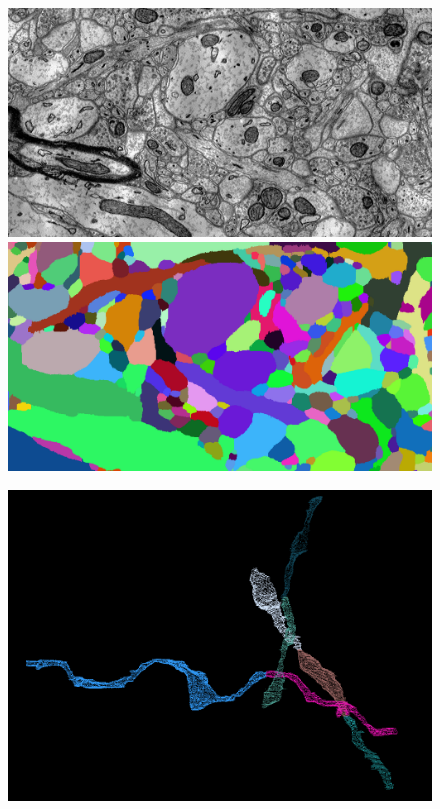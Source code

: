 \documentclass[10pt,twocolumn,letterpaper]{article}
\begin{document}
\begin{figure}[t]\footnotesize
	\vspace{-2.3in}
	\begin{minipage}{\textwidth}
		\begin{minipage}{0.2\textwidth}
			 \includegraphics[width=\linewidth]{figures/schema/teaser-image.png}
			\includegraphics[width=\linewidth]{figures/schema/teaser-segmentation.png}
		\end{minipage}
		\begin{minipage}{0.2\textwidth}
			\includegraphics[width=\linewidth]{figures/schema/pre-multicut.png}

\end{minipage}
\end{minipage}
\end{figure}
\end{document}
